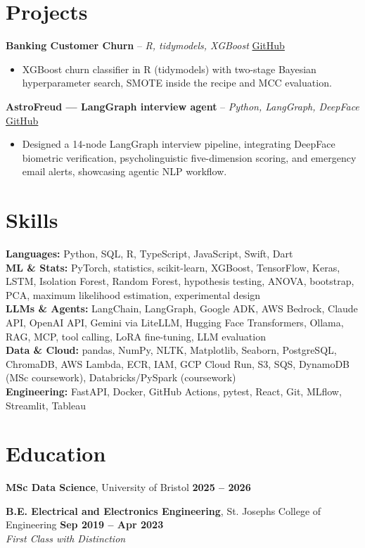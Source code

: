 \documentclass[a4paper,10pt]{article}
\begin{document}
\section{Projects}
\noindent\textbf{Banking Customer Churn} -- \textit{R, tidymodels, XGBoost} \hfill \href{https://github.com/Thiruvel-AP/Banking-Customer-Churn-Prediction}{GitHub}
\begin{itemize}
  \item XGBoost churn classifier in R (tidymodels) with two-stage Bayesian hyperparameter search, SMOTE inside the recipe and MCC evaluation.
\end{itemize}
\noindent\textbf{AstroFreud — LangGraph interview agent} -- \textit{Python, LangGraph, DeepFace} \hfill \href{https://github.com/Thiruvel-AP/AstroFreud}{GitHub}
\begin{itemize}
  \item Designed a 14-node LangGraph interview pipeline, integrating DeepFace biometric verification, psycholinguistic five-dimension scoring, and emergency email alerts, showcasing agentic NLP workflow.
\end{itemize}

\section{Skills}
\textbf{Languages:} Python, SQL, R, TypeScript, JavaScript, Swift, Dart\\
\textbf{ML \& Stats:} PyTorch, statistics, scikit-learn, XGBoost, TensorFlow, Keras, LSTM, Isolation Forest, Random Forest, hypothesis testing, ANOVA, bootstrap, PCA, maximum likelihood estimation, experimental design\\
\textbf{LLMs \& Agents:} LangChain, LangGraph, Google ADK, AWS Bedrock, Claude API, OpenAI API, Gemini via LiteLLM, Hugging Face Transformers, Ollama, RAG, MCP, tool calling, LoRA fine-tuning, LLM evaluation\\
\textbf{Data \& Cloud:} pandas, NumPy, NLTK, Matplotlib, Seaborn, PostgreSQL, ChromaDB, AWS Lambda, ECR, IAM, GCP Cloud Run, S3, SQS, DynamoDB (MSc coursework), Databricks/PySpark (coursework)\\
\textbf{Engineering:} FastAPI, Docker, GitHub Actions, pytest, React, Git, MLflow, Streamlit, Tableau

\section{Education}
\textbf{MSc Data Science}, University of Bristol \hfill \textbf{2025 – 2026}\par
\vspace{2pt}
\textbf{B.E. Electrical and Electronics Engineering}, St. Joseph\textquotesingle{}s College of Engineering \hfill \textbf{Sep 2019 – Apr 2023}\\ \textit{First Class with Distinction}\par
\end{document}
